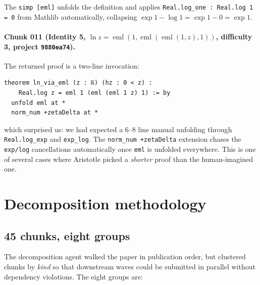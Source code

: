 \documentclass[11pt,a4paper]{article}
\theoremstyle{plain}
\theoremstyle{definition}
\newcommand{\eml}{\operatorname{eml}}
\begin{document}
\noindent The \texttt{simp [eml]} unfolds the definition and applies
\texttt{Real.log\_one : Real.log 1 = 0} from Mathlib automatically,
collapsing $\exp 1 - \log 1 = \exp 1 - 0 = \exp 1$.

\paragraph{Chunk 011 (Identity 5, $\ln z = \eml(1,\eml(\eml(1,z),1))$,
difficulty 3, project \texttt{9880ea74}).}  The returned proof is a
two-line invocation:

\begin{lstlisting}
theorem ln_via_eml (z : ℝ) (hz : 0 < z) :
    Real.log z = eml 1 (eml (eml 1 z) 1) := by
  unfold eml at *
  norm_num +zetaDelta at *
\end{lstlisting}

\noindent which surprised us: we had expected a 6--8 line manual
unfolding through \texttt{Real.log\_exp} and \texttt{exp\_log}.  The
\texttt{norm\_num +zetaDelta} extension chases the \texttt{exp/log}
cancellations automatically once \texttt{eml} is unfolded everywhere.
This is one of several cases where Aristotle picked a \emph{shorter}
proof than the human-imagined one.

\section{Decomposition methodology}\label{sec:decomp}

\subsection{45 chunks, eight groups}

The decomposition agent walked the paper in publication order, but
clustered chunks by \emph{kind} so that downstream waves could be
submitted in parallel without dependency violations.  The eight groups
are:
\end{document}
